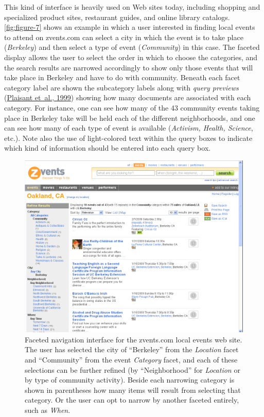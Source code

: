 \documentclass[sigconf,nonacm,screen,pbalance]{acmart}
\begin{document}
This kind of interface is heavily used on Web sites today, including shopping and specialized product
sites, restaurant guides, and online library catalogs. \autoref{fig:figure-7} shows an
example in which a user interested in finding local events to attend on zvents.com can select a city in
which the event is to take place ({\em  Berkeley}) and then select a type of event ({\em  Community})
in this case. The faceted display allows the user to select the order in which to choose the categories,
and the search results are narrowed accordingly to show only those events that will take place in
Berkeley and have to do with community. Beneath each facet category label are shown the subcategory
labels along with {\em  query previews} (\href{https://searchuserinterfaces.com/book/sui_references.html#plaisant99}{Plaisant et~al., 1999}) showing how many documents are associated with each category. For instance,
one can see how many of the 43 community events taking place in Berkeley take will be held each of the
different neighborhoods, and one can see how many of each type of event is available ({\em  Activism,
Health, Science}, etc.). Note also the use of light-colored text within the query boxes to indicate
which kind of information should be entered into each query box.

\begin{figure}[ht]
    \includegraphics[width=\columnwidth]{./zvents.png}
    \vspace{-20pt}
    \caption{Faceted navigation interface for the zvents.com local events
    web site. The user has selected the city of ``Berkeley'' from the {\em  Location} facet and ``Community''
    from the event {\em  Category} facet, and each of these selections can be further refined (by
    ``Neighborhood'' for {\em  Location} or by type of community activity). Beside each narrowing category
    is shown in parentheses how many items will result from selecting that category. Or the user can opt
    to narrow by another faceted entirely, such as {\em  When}.}
    \label{fig:figure-7}
    \vspace{-10pt}
\end{figure}
\end{document}
